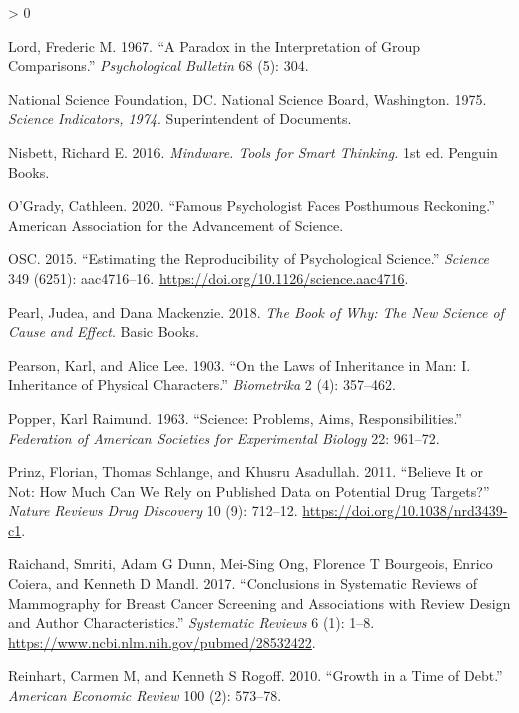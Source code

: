 \documentclass[
  10pt,
  b5paper]{book}
\newlength{\cslhangindent}
\newenvironment{CSLReferences}[2] %
 {%
  \setlength{\parindent}{0pt}
  \ifodd #1 \everypar{\setlength{\hangindent}{\cslhangindent}}\ignorespaces\fi
  \ifnum #2 > 0
  \setlength{\parskip}{#2\baselineskip}
  \fi
 }%
 {}
\begin{document}
\begin{CSLReferences}{1}{0}
\leavevmode\hypertarget{ref-lord1967paradox}{}%
Lord, Frederic M. 1967. {``A Paradox in the Interpretation of Group Comparisons.''} \emph{Psychological Bulletin} 68 (5): 304.

\leavevmode\hypertarget{ref-national1975science}{}%
National Science Foundation, DC. National Science Board, Washington. 1975. \emph{Science Indicators, 1974}. Superintendent of Documents.

\leavevmode\hypertarget{ref-nisbett}{}%
Nisbett, Richard E. 2016. \emph{Mindware. Tools for Smart Thinking.} 1st ed. Penguin Books.

\leavevmode\hypertarget{ref-o2020famous}{}%
O'Grady, Cathleen. 2020. {``Famous Psychologist Faces Posthumous Reckoning.''} American Association for the Advancement of Science.

\leavevmode\hypertarget{ref-osc_EstRep2015}{}%
OSC. 2015. {``Estimating the Reproducibility of Psychological Science.''} \emph{Science} 349 (6251): aac4716--16. \url{https://doi.org/10.1126/science.aac4716}.

\leavevmode\hypertarget{ref-pearl2018book}{}%
Pearl, Judea, and Dana Mackenzie. 2018. \emph{The Book of Why: The New Science of Cause and Effect}. Basic Books.

\leavevmode\hypertarget{ref-pearson1903laws}{}%
Pearson, Karl, and Alice Lee. 1903. {``On the Laws of Inheritance in Man: I. Inheritance of Physical Characters.''} \emph{Biometrika} 2 (4): 357--462.

\leavevmode\hypertarget{ref-popper_1963}{}%
Popper, Karl Raimund. 1963. {``Science: Problems, Aims, Responsibilities.''} \emph{Federation of American Societies for Experimental Biology} 22: 961--72.

\leavevmode\hypertarget{ref-r9_prinz_schlange_asadullah_2011}{}%
Prinz, Florian, Thomas Schlange, and Khusru Asadullah. 2011. {``Believe It or Not: How Much Can We Rely on Published Data on Potential Drug Targets?''} \emph{Nature Reviews Drug Discovery} 10 (9): 712--12. \url{https://doi.org/10.1038/nrd3439-c1}.

\leavevmode\hypertarget{ref-raichand2017conclusions}{}%
Raichand, Smriti, Adam G Dunn, Mei-Sing Ong, Florence T Bourgeois, Enrico Coiera, and Kenneth D Mandl. 2017. {``Conclusions in Systematic Reviews of Mammography for Breast Cancer Screening and Associations with Review Design and Author Characteristics.''} \emph{Systematic Reviews} 6 (1): 1--8. \url{https://www.ncbi.nlm.nih.gov/pubmed/28532422}.

\leavevmode\hypertarget{ref-reinhart2010growth}{}%
Reinhart, Carmen M, and Kenneth S Rogoff. 2010. {``Growth in a Time of Debt.''} \emph{American Economic Review} 100 (2): 573--78.


\end{CSLReferences}
\end{document}
